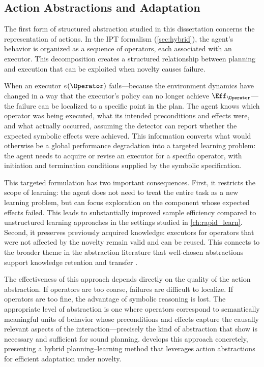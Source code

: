 \subsection{Action Abstractions and Adaptation}
\label{sec:action_abstractions}

The first form of structured abstraction studied in this dissertation concerns the representation of actions. In the IPT formalism (\cref{sec:hybrid}), the agent's behavior is organized as a sequence of operators, each associated with an executor. This decomposition creates a structured relationship between planning and execution that can be exploited when novelty causes failure.

When an executor $e(\Operator)$ fails---because the environment dynamics have changed in a way that the executor's policy can no longer achieve $\Eff_{\Operator}$---the failure can be localized to a specific point in the plan. The agent knows which operator was being executed, what its intended preconditions and effects were, and what actually occurred, assuming the detector can report whether the expected symbolic effects were achieved. This information converts what would otherwise be a global performance degradation into a targeted learning problem: the agent needs to acquire or revise an executor for a specific operator, with initiation and termination conditions supplied by the symbolic specification.

This targeted formulation has two important consequences. First, it restricts the scope of learning: the agent does not need to treat the entire task as a new learning problem, but can focus exploration on the component whose expected effects failed. This leads to substantially improved sample efficiency compared to unstructured learning approaches in the settings studied in \cref{ch:rapid_learn}. Second, it preserves previously acquired knowledge: executors for operators that were not affected by the novelty remain valid and can be reused. This connects to the broader theme in the abstraction literature that well-chosen abstractions support knowledge retention and transfer \citep{abel2018state, konidaris2007building}.

The effectiveness of this approach depends directly on the quality of the action abstraction. If operators are too coarse, failures are difficult to localize. If operators are too fine, the advantage of symbolic reasoning is lost. The appropriate level of abstraction is one where operators correspond to semantically meaningful units of behavior whose preconditions and effects capture the causally relevant aspects of the interaction---precisely the kind of abstraction that \citet{konidaris2018skills} show is necessary and sufficient for sound planning.  develops this approach concretely, presenting a hybrid planning--learning method that leverages action abstractions for efficient adaptation under novelty.

